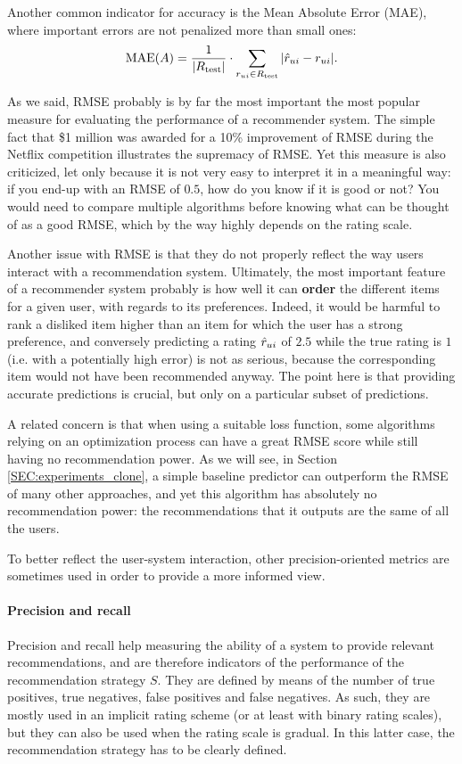 Another common indicator for accuracy is the Mean Absolute Error (MAE), where
important errors are not penalized more than small ones:
$$\text{MAE}(A) = \frac{1}{|R_{\text{test}}|} \cdot \sum_{r_{ui} \in R_{\text{test}}}|\hat{r}_{ui} -
r_{ui}|.$$

As we said, RMSE probably is by far the most important the most popular measure for
evaluating the performance of a recommender system. The simple fact that \$1
million was awarded for a 10\% improvement of RMSE during the Netflix competition
illustrates the supremacy of RMSE. Yet this measure is also criticized, let
only because it is not very easy to interpret it in a meaningful way: if you
end-up with an RMSE of $0.5$, how do you know if it is good or not? You would
need to compare multiple algorithms before knowing what can be thought of as a
good RMSE, which by the way highly depends on  the rating scale.

Another issue with RMSE is that they do not properly reflect the way users
interact with a recommendation system.  Ultimately, the most important feature
of a recommender system probably is how well it can \textbf{order} the
different items for a given user, with regards to its preferences. Indeed, it
would be harmful to rank a disliked item higher than an item for which the user
has a strong preference, and conversely predicting a rating $\hat{r}_{ui}$ of $2.5$
while the true rating is $1$ (i.e. with a potentially high error) is not as
serious, because the corresponding item would not have been recommended anyway.
The point here is that providing accurate predictions is crucial, but only on a
particular subset of predictions.

A related concern is that when using a suitable loss function, some algorithms
relying on an optimization process
can have a great RMSE score while still having no recommendation power.
As we will see, in Section \ref{SEC:experiments_clone}, a simple baseline
predictor  can outperform the RMSE of many other approaches, and yet this
algorithm has absolutely no recommendation power: the recommendations that it
outputs are the same of all the users.

To better reflect the user-system interaction, other precision-oriented metrics
are sometimes used in order to provide a more informed view.

\paragraph{Precision and recall\\}
Precision and recall help measuring the ability of a system to provide relevant
recommendations, and are therefore indicators of the performance of the
recommendation strategy $S$. They are defined by means of the number of true
positives, true negatives, false positives and false negatives. As such, they
are mostly used in an implicit rating scheme (or at least with binary rating
scales), but they can also be used when the rating scale is gradual. In this
latter case, the recommendation strategy has to be clearly defined.

